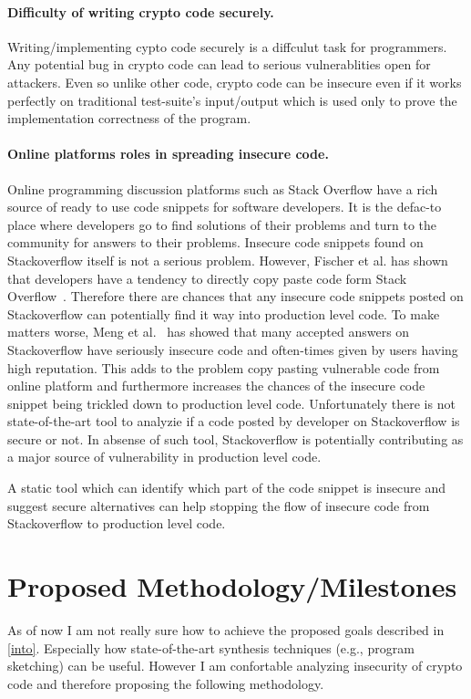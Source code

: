 \documentclass[sigconf]{acmart}
\begin{document}
\paragraph{Difficulty of writing crypto code securely.} Writing/implementing cypto code securely is a diffculut task for programmers. Any potential bug in crypto code can lead to serious vulnerablities open for attackers.
Even so unlike other code, crypto code can be insecure even if it works 
perfectly on traditional test-suite's input/output which is used only to prove the implementation correctness of the program.

\paragraph{Online platforms roles in spreading insecure code.} Online programming discussion platforms such as Stack Overflow have a rich source of ready to use code snippets for software developers. It is the defac-to place where developers go to find solutions of their problems and turn to the community for answers to their problems. 
Insecure code snippets found on Stackoverflow itself is not a serious problem. However,  
Fischer et al. has shown that developers have a tendency to directly copy paste code form Stack Overflow~\cite{fischer2017stack}. Therefore there are chances that any insecure code snippets posted on Stackoverflow can potentially find it way into production level code. To make matters worse, Meng et al.~\cite{meng2018secure} has showed that many accepted answers on Stackoverflow have seriously insecure code and often-times given by users having high reputation. This adds to the problem copy pasting vulnerable code from online platform and furthermore increases the chances of the insecure code snippet being trickled down to production level code. 
Unfortunately there is not state-of-the-art tool to analyzie if a code posted by developer on Stackoverflow is secure or not. In absense of such tool, Stackoverflow is potentially contributing as a major source of vulnerability in production level code.  

A static tool which can identify which part of the code snippet is insecure and suggest secure alternatives can help stopping the flow of insecure code from Stackoverflow to production level code.

\section{Proposed Methodology/Milestones}
As of now I am not really sure how to achieve the proposed goals described in \cref{into}. Especially how state-of-the-art synthesis techniques (e.g., program sketching) can be useful. However I am confortable analyzing insecurity of crypto code and therefore proposing the following methodology. 
\end{document}
